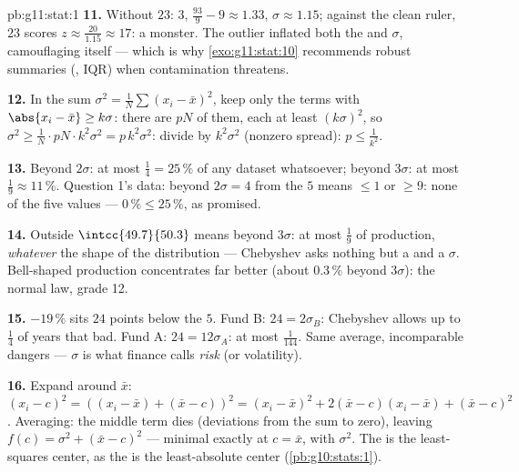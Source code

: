 \begin{solution}{pb:g11:stat:1}
\textbf{11.} Without $23$:  $3$, 
$\frac{93}{9} - 9 \approx 1.33$, $\sigma \approx 1.15$;
against the clean ruler, $23$ scores
$z \approx \frac{20}{1.15} \approx 17$: a monster. The outlier
inflated both the  and $\sigma$, camouflaging itself ---
which is why \cref{exo:g11:stat:10} recommends robust
summaries (, IQR) when contamination threatens.

\textbf{12.} In the  sum
$\sigma^2 = \frac1N \sum (x_i - \bar x)^2$, keep only the
terms with $\abs{x_i - \bar x} \geq k\sigma$: there are $pN$
of them, each at least $(k\sigma)^2$, so
$\sigma^2 \geq \frac{1}{N} \cdot pN \cdot k^2\sigma^2 =
p\,k^2\sigma^2$: divide by $k^2 \sigma^2$ (nonzero spread):
$p \leq \frac{1}{k^2}$.

\textbf{13.} Beyond $2\sigma$: at most $\frac14 = 25\,\%$ of
any dataset whatsoever; beyond $3\sigma$: at most
$\frac19 \approx 11\,\%$. Question 1's data: beyond
$2\sigma = 4$ from the  $5$ means $\leq 1$ or $\geq 9$:
none of the five values --- $0\,\% \leq 25\,\%$, as promised.

\textbf{14.} Outside $\intcc{49.7}{50.3}$ means beyond
$3\sigma$: at most $\frac19$ of production, \emph{whatever}
the shape of the distribution --- Chebyshev asks nothing but a
 and a $\sigma$. Bell-shaped production concentrates far
better (about $0.3\,\%$ beyond $3\sigma$): the normal law,
grade 12.

\textbf{15.} $-19\,\%$ sits $24$ points below the  $5$.
Fund B: $24 = 2\sigma_B$: Chebyshev allows up to
$\frac14$ of years that bad. Fund A: $24 = 12\sigma_A$: at
most $\frac{1}{144}$. Same average, incomparable dangers ---
$\sigma$ is what finance calls \emph{risk} (or volatility).

\textbf{16.} Expand around $\bar x$:
$(x_i - c)^2 = \left((x_i - \bar x) + (\bar x - c)\right)^2
= (x_i - \bar x)^2 + 2(\bar x - c)(x_i - \bar x) +
(\bar x - c)^2$. Averaging: the middle term dies (deviations
from the  sum to zero), leaving
$f(c) = \sigma^2 + (\bar x - c)^2$ --- minimal exactly at
$c = \bar x$, with  $\sigma^2$. The  is the
least-squares center, as the  is the least-absolute
center (\cref{pb:g10:stats:1}).


\end{solution}
